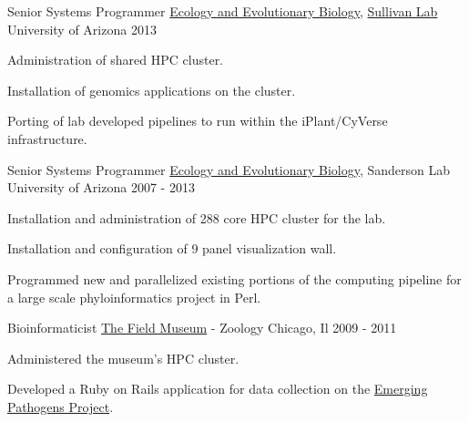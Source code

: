 \begin{cventries}
  \cventry
    {Senior Systems Programmer} %
    {\href{http://eeb.arizona.edu/}{Ecology and Evolutionary Biology}, \href{https://u.osu.edu/viruslab/}{Sullivan Lab}} %
    {University of Arizona} %
    {2013} %
    {
      \begin{cvitems} %
        \item {Administration of shared HPC cluster.}
        \item {Installation of genomics applications on the cluster.}
        \item {Porting of lab developed pipelines to run within the iPlant/CyVerse infrastructure.}
      \end{cvitems}
    }

  \cventry
    {Senior Systems Programmer} %
    {\href{http://eeb.arizona.edu/}{Ecology and Evolutionary Biology}, Sanderson Lab} %
    {University of Arizona} %
    {2007 - 2013} %
    {
      \begin{cvitems} %
        \item {Installation and administration of 288 core HPC cluster for the lab.}
        \item {Installation and configuration of 9 panel visualization wall.}
        \item {Programmed new and parallelized existing portions of the computing pipeline for a large scale phyloinformatics project in Perl.}
      \end{cvitems}
    }

  \cventry
    {Bioinformaticist} %
    {\href{http://www.fieldmuseum.org/}{The Field Museum} - Zoology} %
    {Chicago, Il} %
    {2009 - 2011} %
    {
      \begin{cvitems} %
        \item {Administered the museum's HPC cluster.}
        \item {Developed a Ruby on Rails application for data collection on the \href{https://www.fieldmuseum.org/emerging-pathogens-project}{Emerging Pathogens Project}.}
      \end{cvitems}
    }


\end{cventries}
